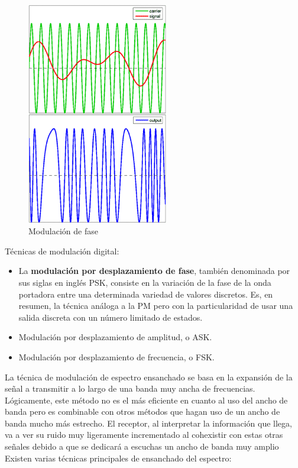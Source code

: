 \begin{figure}[tb]
\centering
\includegraphics[width=0.55\textwidth]{figuras/ModulacionFase.png}
\caption{Modulación de fase}
\label{fig:modulacionfase}
\end{figure}

Técnicas de modulación digital:

\begin{itemize}
\item La \textbf{modulación por desplazamiento de fase}, también denominada por sus siglas en inglés PSK, consiste en la variación de la fase de la onda portadora entre una determinada variedad de valores discretos. Es, en resumen, la técnica análoga a la PM pero con la particularidad de usar una salida discreta con un número limitado de estados.
\item Modulación por desplazamiento de amplitud, o ASK.
\item Modulación por desplazamiento de frecuencia, o FSK. 
\end{itemize}

La técnica de modulación de espectro ensanchado se basa en la expansión de la señal a transmitir a lo largo de una banda muy ancha de frecuencias. Lógicamente, este método no es el más eficiente en cuanto al uso del ancho de banda pero es combinable con otros métodos que hagan uso de un ancho de banda mucho más estrecho. El receptor, al interpretar la información que llega, va a ver su ruido muy ligeramente incrementado al cohexistir con estas otras señales debido a que se dedicará a escuchas un ancho de banda muy amplio
Existen varias técnicas principales de ensanchado del espectro:

